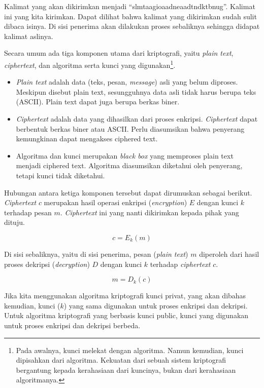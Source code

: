 Kalimat yang akan dikirimkan menjadi ``slmtaagioaadneaadtndktbnug''. Kalimat
ini yang kita kirimkan. Dapat dilihat bahwa kalimat yang dikirimkan sudah sulit
dibaca isinya. Di sisi penerima akan dilakukan proses sebaliknya sehingga
didapat kalimat aslinya.


Secara umum ada tiga komponen utama dari kriptografi, yaitu {\em plain text},
{\em ciphertext}, dan algoritma serta kunci yang digunakan\footnote{Pada
awalnya, kunci melekat dengan algoritma. Namun kemudian, kunci dipisahkan dari
algoritma. Kekuatan dari sebuah sistem kriptografi bergantung kepada
kerahasiaan dari kuncinya, bukan dari kerahasiaan algoritmanya.}.
\begin{itemize}
  \item {\em Plain text} adalah data (teks, pesan, {\em message}) asli yang
  belum diproses. Meskipun disebut plain text, sesungguhnya data asli tidak
  harus berupa teks (ASCII). Plain text dapat juga berupa berkas biner.
  \item {\em Ciphertext} adalah data yang dihasilkan dari proses enkripsi.
     {\em Ciphertext} dapat berbentuk berkas biner atau ASCII. Perlu diasumsikan
  bahwa penyerang kemungkinan dapat mengakses ciphered text.
  \item Algoritma dan kunci merupakan {\em black box} yang memproses plain text
  menjadi ciphered text. Algoritma diasumsikan diketahui oleh penyerang,
  tetapi kunci tidak diketahui.
\end{itemize}

Hubungan antara ketiga komponen tersebut dapat dirumuskan sebagai berikut.
{\em Ciphertext} $c$ merupakan hasil operasi enkripsi ({\em encryption}) $E$ 
dengan kunci $k$ terhadap pesan $m$. {\em Ciphertext} ini yang nanti dikirimkan
kepada pihak yang dituju.

\begin{equation}
   c = E_k(m)
\end{equation}

Di sisi sebaliknya, yaitu di sisi penerima, pesan ({\em plain text}) $m$
diperoleh dari hasil proses dekripsi ({\em decryption}) $D$ dengan kunci $k$
terhadap {\em ciphertext} $c$.

\begin{equation}
   m = D_k(c)
\end{equation}

Jika kita menggunakan algoritma kriptografi kunci privat, yang akan dibahas
kemudian, kunci ($k$) yang sama digunakan untuk proses enkripsi dan dekripsi.
Untuk algoritma kriptografi yang berbasis kunci public, kunci yang digunakan
untuk proses enkripsi dan dekripsi berbeda.


